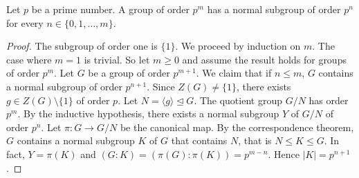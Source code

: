 \begin{theorem}
    Let $p$ be a prime number. 
    A group of order $p^m$ has a normal subgroup of order
    $p^n$ for every $n\in\{0,1,\dots,m\}$. 
\end{theorem}

\begin{proof}
    The subgroup of order one is $\{1\}$.
    We proceed by induction on $m$. The case where $m=1$ is trivial. So let $m\geq0$ and 
    assume the result holds for groups of order $p^m$. Let
    $G$ be a group of order $p^{m+1}$.
    We claim that if $n\leq m$, $G$ contains a normal subgroup of
    order $p^{n+1}$. Since $Z(G)\ne\{1\}$, there exists
    $g\in Z(G)\setminus\{1\}$ of order $p$. Let
$N=\langle g\rangle\unlhd G$. The quotient 
group $G/N$ has order $p^m$. By the inductive hypothesis, 
there exists a normal subgroup $Y$ of $G/N$ of order $p^n$. Let 
$\pi\colon G\to G/N$ be the canonical map. 
By the correspondence theorem, $G$ contains a normal subgroup $K$ of $G$ 
that contains $N$, that is $N\leq K\leq G$. In fact, 
$Y=\pi(K)$ and 
$(G:K)=(\pi(G):\pi(K))=p^{m-n}$. Hence $|K|=p^{n+1}$.
\end{proof}


